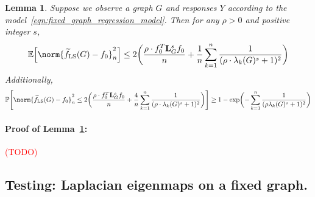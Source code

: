 \documentclass{article}
\newcommand{\1}{\mathbf{1}}
\newcommand{\Lap}{{\bf L}}
\newcommand{\Pbb}{\mathbb{P}}
\newcommand{\Ebb}{\mathbb{E}}
\newcommand{\wt}[1]{\widetilde{#1}}
\newcommand{\LS}{\mathrm{LS}}
\theoremstyle{alden}
\theoremstyle{aldenthm}
\newtheorem{lemma}{Lemma}
\theoremstyle{definition}
\theoremstyle{remark}
\begin{document}
\begin{lemma}
	\label{lem:ls_fixed_graph_estimation}
	Suppose we observe a graph $G$ and responses $Y$ according to the model~\eqref{eqn:fixed_graph_regression_model}. Then for any $\rho > 0$ and positive integer $s$,
	\begin{equation}
	\label{eqn:ls_fixed_graph_estimation}
	\Ebb\Bigl[\norm{\wt{f}_{\LS}(G) - f_0}_n^2\Bigr] \leq 2\biggl(\frac{\rho \cdot f_0^T \Lap_{G}^s f_0}{n} + \frac{1}{n}\sum_{k = 1}^{n} \frac{1}{(\rho \cdot \lambda_{k}(G)^s + 1)^2}\biggr)
	\end{equation}
	Additionally,
	\begin{equation}
	\label{eqn:ls_fixed_graph_estimation_prob}
	\Pbb\Biggl[\norm{\wt{f}_{\LS}(G) - f_0}_n^2 \leq 2\biggl(\frac{\rho \cdot f_0^T \Lap_{G}^s f_0}{n} + \frac{4}{n}\sum_{k = 1}^{n} \frac{1}{(\rho \cdot \lambda_{k}(G)^s + 1)^2}\biggr)\Biggr] \geq 1 - \exp\biggl(-\sum_{k = 1}^{n}\frac{1}{(\rho \lambda_k(G)^s + 1)^2}\biggr)
	\end{equation}
\end{lemma}

\paragraph{Proof of Lemma~\ref{lem:ls_fixed_graph_estimation}:} 

\textcolor{red}{(TODO)}

\subsection{Testing: Laplacian eigenmaps on a fixed graph.}
\end{document}
